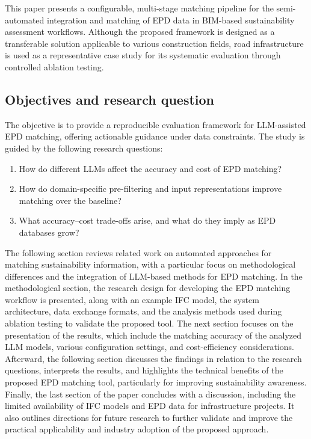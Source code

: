 \documentclass[10pt, a4paper, twocolumn]{article}
\begin{document}
This paper presents a configurable, multi-stage matching pipeline for the semi-automated integration and matching of EPD data in BIM-based sustainability assessment workflows. Although the proposed framework is designed as a transferable solution applicable to various construction fields, road infrastructure is used as a representative case study for its systematic evaluation through controlled ablation testing.

\subsection{Objectives and research question}

The objective is to provide a reproducible evaluation framework for LLM-assisted EPD matching, offering actionable guidance under data constraints. The study is guided by the following research questions:

\begin{enumerate}[label=\textbf{RQ\arabic*:}, leftmargin=*, labelsep=0.5em,
                  itemsep=2pt, topsep=3pt]
  \item How do different LLMs affect the accuracy and cost of EPD matching?
  \item How do domain-specific pre-filtering and input representations improve
        matching over the baseline?
  \item What accuracy--cost trade-offs arise, and what do they imply as EPD
        databases grow?
\end{enumerate}

The following section reviews related work on automated approaches for matching sustainability information, with a particular focus on methodological differences and the integration of LLM-based methods for EPD matching. In the methodological section, the research design for developing the EPD matching workflow is presented, along with an example IFC model, the system architecture, data exchange formats, and the analysis methods used during ablation testing to validate the proposed tool. The next section focuses on the presentation of the results, which include the matching accuracy of the analyzed LLM models, various configuration settings, and cost-efficiency considerations. Afterward, the following section discusses the findings in relation to the research questions, interprets the results, and highlights the technical benefits of the proposed EPD matching tool, particularly for improving sustainability awareness. Finally, the last section of the paper concludes with a discussion, including the limited availability of IFC models and EPD data for infrastructure projects. It also outlines directions for future research to further validate and improve the practical applicability and industry adoption of the proposed approach.
\end{document}
